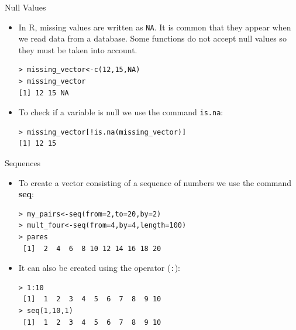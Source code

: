 \documentclass[handout]{beamer}
\begin{document}
\begin{frame}[fragile]{Null Values}
\scriptsize{
\begin{itemize}
\item In R, missing values are written as \verb+NA+. It is common that they appear when we read data from a database. Some functions do not accept null values so they must be taken into account.
\begin{verbatim}
> missing_vector<-c(12,15,NA)
> missing_vector
[1] 12 15 NA
\end{verbatim}

\item To check if a variable is null we use the command \verb+is.na+:
\begin{verbatim}
> missing_vector[!is.na(missing_vector)]
[1] 12 15 
\end{verbatim}



\end{itemize}

 }
 
 
\end{frame}




\begin{frame}[fragile]{Sequences}
 \scriptsize{
 
 \begin{itemize}
  \item To create a vector consisting of a sequence of numbers we use the command \textbf{seq}:
 
 \begin{verbatim}
> my_pairs<-seq(from=2,to=20,by=2)
> mult_four<-seq(from=4,by=4,length=100)
> pares
 [1]  2  4  6  8 10 12 14 16 18 20
 \end{verbatim} 
 \item It can also be created using the operator (\verb+:+):
 \begin{verbatim}
> 1:10
 [1]  1  2  3  4  5  6  7  8  9 10 
> seq(1,10,1)
 [1]  1  2  3  4  5  6  7  8  9 10
 \end{verbatim} 
 \end{itemize}
 
 }
\end{frame}
\end{document}
